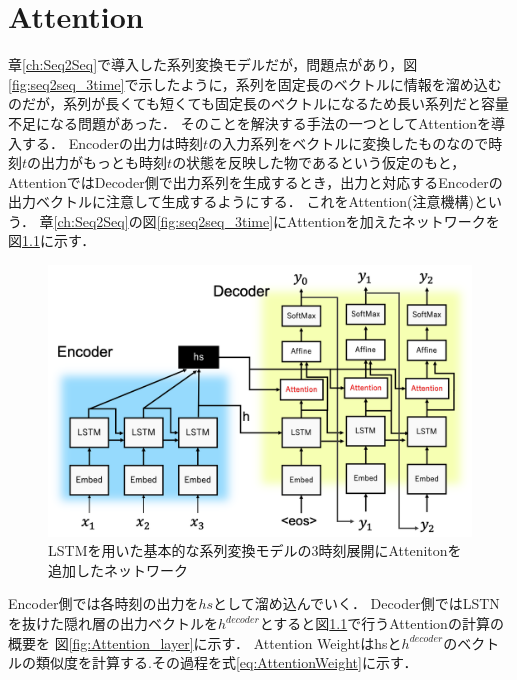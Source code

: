 \documentclass[a4j,11pt,report]{jsbook}
\begin{document}
\chapter{Attention\label{ch:attention} }
章\ref{ch:Seq2Seq}で導入した系列変換モデルだが，問題点があり，図\ref{fig:seq2seq_3time}で示したように，系列を固定長のベクトルに情報を溜め込むのだが，系列が長くても短くても固定長のベクトルになるため長い系列だと容量不足になる問題があった．
そのことを解決する手法の一つとしてAttentionを導入する．
Encoderの出力は時刻$t$の入力系列をベクトルに変換したものなので時刻$t$の出力がもっとも時刻$t$の状態を反映した物であるという仮定のもと，
AttentionではDecoder側で出力系列を生成するとき，出力と対応するEncoderの出力ベクトルに注意して生成するようにする．
これをAttention(注意機構)という．
章\ref{ch:Seq2Seq}の図\ref{fig:seq2seq_3time}にAttentionを加えたネットワークを図\ref{fig:Attention_3time}に示す．




\begin{center}
  \begin{figure}[h]
    \centering
    \includegraphics[width=\linewidth]{image/attention_image.png}
    \caption{LSTMを用いた基本的な系列変換モデルの3時刻展開にAttenitonを追加したネットワーク　}
    \label{fig:Attention_3time}
  \end{figure}
\end{center}



Encoder側では各時刻の出力を$hs$として溜め込んでいく．
Decoder側ではLSTNを抜けた隠れ層の出力ベクトルを$h^{decoder}$とすると図\ref{fig:Attention_3time}で行うAttentionの計算の概要を
図\ref{fig:Attention_layer}に示す．
Attention Weightはhsと$h^{decoder}$のベクトルの類似度を計算する.その過程を式\ref{eq:AttentionWeight}に示す．
\end{document}
